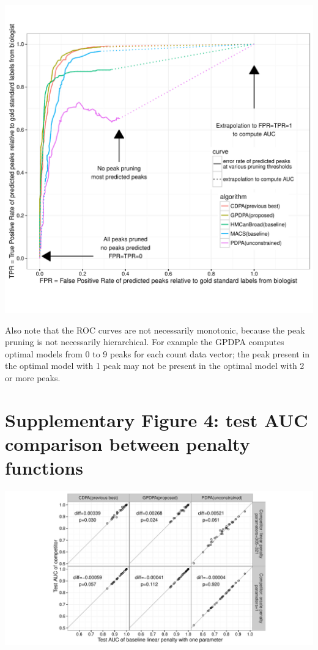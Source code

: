 \documentclass{article}
\begin{document}
\includegraphics[width=\textwidth]{figure-test-error-dots-ROC-supp.pdf}

Also note that the ROC curves are not necessarily monotonic, because
the peak pruning is not necessarily hierarchical. For example the
GPDPA computes optimal models from 0 to 9 peaks for each count data
vector; the peak present in the optimal model with 1 peak may not be
present in the optimal model with 2 or more peaks.

\section*{Supplementary Figure 4: test AUC comparison between penalty functions}

\includegraphics[width=\textwidth]{figure-all-cv-learned-oracle-compare}
\end{document}
